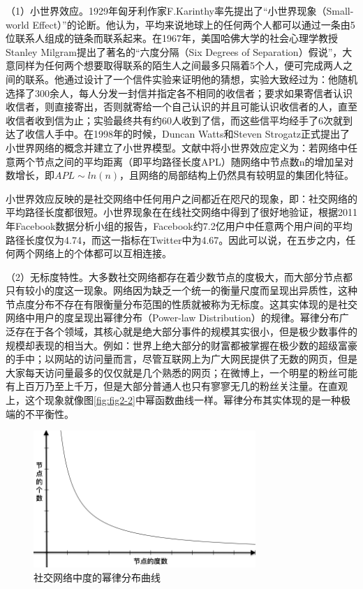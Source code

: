 （1）小世界效应。1929年匈牙利作家F.Karinthy率先提出了“小世界现象（Small-world Effect）”的论断。他认为，平均来说地球上的任何两个人都可以通过一条由5位联系人组成的链条而联系起来。在1967年，美国哈佛大学的社会心理学教授Stanley Milgram提出了著名的“六度分隔（Six Degrees of Separation）假说”\cite{Milgram1967The}，大意同样为任何两个想要取得联系的陌生人之间最多只隔着5个人，便可完成两人之间的联系。他通过设计了一个信件实验来证明他的猜想，实验大致经过为：他随机选择了300余人，每人分发一封信并指定各不相同的收信者；要求如果寄信者认识收信者，则直接寄出，否则就寄给一个自己认识的并且可能认识收信者的人，直至收信者收到信为止；实验最终共有约60人收到了信，而这些信平均经手了6次就到达了收信人手中。在1998年的时候，Duncan Watts和Steven Strogatz正式提出了小世界网络的概念并建立了小世界模型\cite{Watts1998Collectivedynamics}。文献中将小世界效应定义为：若网络中任意两个节点之间的平均距离（即平均路径长度APL）随网络中节点数n的增加呈对数增长，即$APL\sim ln(n)$，且网络的局部结构上仍然具有较明显的集团化特征。

小世界效应反映的是社交网络中任何用户之间都近在咫尺的现象，即：社交网络的平均路径长度都很短。小世界现象在在线社交网络中得到了很好地验证，根据2011年Facebook数据分析小组的报告，Facebook约7.2亿用户中任意两个用户间的平均路径长度仅为4.74，而这一指标在Twitter中为4.67。因此可以说，在五步之内，任何两个网络上的个体都可以互相连接。

（2）无标度特性。大多数社交网络都存在着少数节点的度极大，而大部分节点都只有较小的度这一现象。网络因为缺乏一个统一的衡量尺度而呈现出异质性，这种节点度分布不存在有限衡量分布范围的性质就被称为无标度。这其实体现的是社交网络中用户的度呈现出幂律分布（Power-law Distribution）的规律。幂律分布广泛存在于各个领域，其核心就是绝大部分事件的规模其实很小，但是极少数事件的规模却表现的相当大。例如：世界上绝大部分的财富都被掌握在极少数的超级富豪的手中；以网站的访问量而言，尽管互联网上为广大网民提供了无数的网页，但是大家每天访问量最多的仅仅就是几个熟悉的网页；在微博上，一个明星的粉丝可能有上百万乃至上千万，但是大部分普通人也只有寥寥无几的粉丝关注量。在直观上，这个现象就像图\ref{fig:fig2-2}中幂函数曲线一样。幂律分布其实体现的是一种极端的不平衡性。

\begin{figure}
  \centering
  \includegraphics[width=0.75\textwidth]{figures/fig2-2}
  \caption{社交网络中度的幂律分布曲线}\label{fig2-2}
\end{figure}

